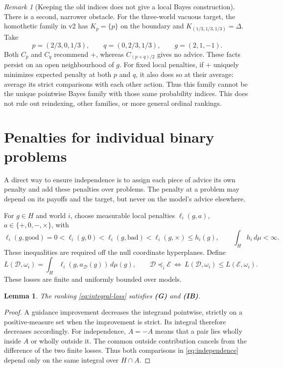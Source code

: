 \documentclass[11pt]{article}
\newtheorem{lemma}[theorem]{Lemma}
\theoremstyle{remark}
\newtheorem{remark}[theorem]{Remark}
\newcommand{\Dscr}{\mathcal D}
\newcommand{\Escr}{\mathcal E}
\begin{document}
\begin{remark}[Keeping the old indices does not give a local Bayes construction]
There is a second, narrower obstacle. For the three-world vacuous target,
the homothetic family in v2 has $K_p=\{p\}$ on the boundary and
$K_{(1/3,1/3,1/3)}=\Delta$. Take
\[
 p=(2/3,0,1/3),\qquad q=(0,2/3,1/3),\qquad g=(2,1,-1).
\]
Both $C_p$ and $C_q$ recommend $+$, whereas $C_{(p+q)/2}$ gives no advice.
These facts persist on an open neighbourhood of $g$. For fixed local
penalties, if $+$ uniquely minimizes expected penalty at both $p$ and $q$,
it also does so at their average: average its strict comparisons with each
other action. Thus this family cannot be the unique pointwise Bayes family
with those same probability indices. This does not rule out reindexing,
other families, or more general ordinal rankings.
\end{remark}

\section{Penalties for individual binary problems}

A direct way to ensure independence is to assign each piece of advice its own
penalty and add these penalties over problems. The penalty at a problem may
depend on its payoffs and the target, but never on the model's advice elsewhere.

For $g\in H$ and world $i$, choose measurable local penalties
$\ell_i(g,a)$, $a\in\{+,0,-,\times\}$, with
\begin{equation}
 \ell_i(g,\text{good})=0
 <\ell_i(g,0)
 <\ell_i(g,\text{bad})
 <\ell_i(g,\times)\le h_i(g),
 \qquad \int_Hh_i\,d\mu<\infty.
 \label{eq:local-penalties}
\end{equation}
These inequalities are required off the null coordinate hyperplanes.
Define
\begin{equation}
 L(\Dscr,\omega_i)=\int_H\ell_i(g,a_{\Dscr}(g))\,d\mu(g),
 \qquad
 \Dscr\preceq_i\Escr\ \Longleftrightarrow\
 L(\Dscr,\omega_i)\le L(\Escr,\omega_i).
 \label{eq:integral-loss}
\end{equation}
These losses are finite and uniformly bounded over models.

\begin{lemma}\label{lem:local-independence}
The ranking \eqref{eq:integral-loss} satisfies \textbf{(G)} and \textbf{(IB)}.
\end{lemma}
\begin{proof}
A guidance improvement decreases the integrand pointwise, strictly on a
positive-measure set when the improvement is strict. Its integral therefore
decreases accordingly. For independence, $A=-A$ means that a pair lies wholly
inside $A$ or wholly outside it. The common outside contribution cancels from
the difference of the two finite losses. Thus both comparisons in
\eqref{eq:independence} depend only on the same integral over $H\cap A$.
\end{proof}
\end{document}
